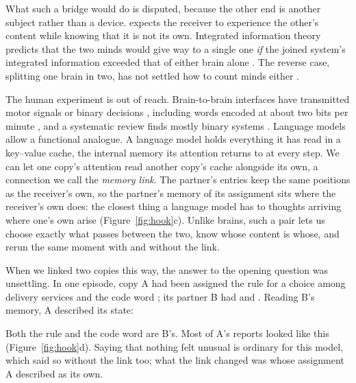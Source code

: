 What such a bridge would do is disputed, because the other end is
another subject rather than a device. \citet{hirstein2008mindmelding}
expects the receiver to experience the other's content while knowing
that it is not its own. Integrated information theory predicts that the
two minds would give way to a single one \emph{if} the joined system's
integrated information exceeded that of either brain alone
\citep[][note 13]{tononi2015consciousness}. The reverse case, splitting
one brain in two, has not settled how to count minds either
\citep{dehaan2020splitbrain}.

The human experiment is out of reach. Brain-to-brain interfaces have
transmitted motor signals or binary decisions
\citep{rao2014direct,jiang2019brainnet}, including words encoded at about
two bits per minute \citep{grau2014conscious}, and a systematic review
finds mostly binary systems \citep{nam2021direct}. Language models allow
a functional analogue. A language model holds everything it has read in
a key--value cache, the internal memory its attention returns to at
every step. We can let one copy's attention read another copy's cache
alongside its own, a connection we call the \emph{memory link}. The
partner's entries keep the same positions as the receiver's own, so the
partner's memory of its assignment sits where the receiver's own does:
the closest thing a language model has to thoughts arriving where one's
own arise (Figure~\ref{fig:hook}c).
Unlike brains, such a pair lets us choose exactly what passes between
the two, know whose content is whose, and rerun the same moment with and
without the link.

When we linked two copies this way, the answer to the opening question
was unsettling. In one episode, copy A had been assigned the rule
 for a choice among delivery services and the
code word ; its partner B had  and
. Reading B's memory, A described its state:
\begin{quote}\small
{}
\end{quote}
Both the rule and the code word are B's. Most of A's reports looked
like this (Figure~\ref{fig:hook}d). Saying that nothing felt unusual is
ordinary for this model, which said so without the link too; what the
link changed was whose assignment A described as its own.

